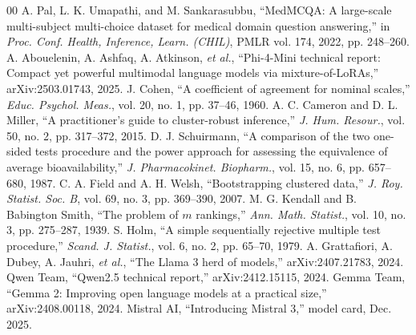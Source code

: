 \documentclass[conference]{IEEEtran}
\begin{document}
\begin{thebibliography}{00}
 A. Pal, L. K. Umapathi, and M. Sankarasubbu, ``MedMCQA: A large-scale multi-subject multi-choice dataset for medical domain question answering,'' in \textit{Proc. Conf. Health, Inference, Learn. (CHIL)}, PMLR vol. 174, 2022, pp. 248--260.
 A. Abouelenin, A. Ashfaq, A. Atkinson, \textit{et al.}, ``Phi-4-Mini technical report: Compact yet powerful multimodal language models via mixture-of-LoRAs,'' arXiv:2503.01743, 2025.
 J. Cohen, ``A coefficient of agreement for nominal scales,'' \textit{Educ. Psychol. Meas.}, vol. 20, no. 1, pp. 37--46, 1960.
 A. C. Cameron and D. L. Miller, ``A practitioner's guide to cluster-robust inference,'' \textit{J. Hum. Resour.}, vol. 50, no. 2, pp. 317--372, 2015.
 D. J. Schuirmann, ``A comparison of the two one-sided tests procedure and the power approach for assessing the equivalence of average bioavailability,'' \textit{J. Pharmacokinet. Biopharm.}, vol. 15, no. 6, pp. 657--680, 1987.
 C. A. Field and A. H. Welsh, ``Bootstrapping clustered data,'' \textit{J. Roy. Statist. Soc. B}, vol. 69, no. 3, pp. 369--390, 2007.
 M. G. Kendall and B. Babington Smith, ``The problem of $m$ rankings,'' \textit{Ann. Math. Statist.}, vol. 10, no. 3, pp. 275--287, 1939.
 S. Holm, ``A simple sequentially rejective multiple test procedure,'' \textit{Scand. J. Statist.}, vol. 6, no. 2, pp. 65--70, 1979.
 A. Grattafiori, A. Dubey, A. Jauhri, \textit{et al.}, ``The Llama 3 herd of models,'' arXiv:2407.21783, 2024.
 Qwen Team, ``Qwen2.5 technical report,'' arXiv:2412.15115, 2024.
 Gemma Team, ``Gemma 2: Improving open language models at a practical size,'' arXiv:2408.00118, 2024.
 Mistral AI, ``Introducing Mistral 3,'' model card, Dec. 2025.
\end{thebibliography}
\end{document}
